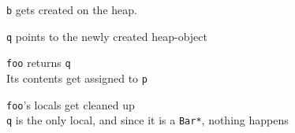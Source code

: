 \begin{frame}
\begin{overprint}
    \begin{center}
      {\tt b} gets created on the heap.
    \end{center}

    \begin{center}
      {\tt q} points to the newly created heap-object
    \end{center}

    \begin{center}
      {\tt foo} returns {\tt q} \\
      Its contents get assigned to {\tt p}
    \end{center}

    \begin{center}
      {\tt foo}'s locals get cleaned up \\
      {\tt q} is the only local, and since it is a {\tt Bar*}, nothing happens
    \end{center}
  \end{overprint}
\end{frame}



